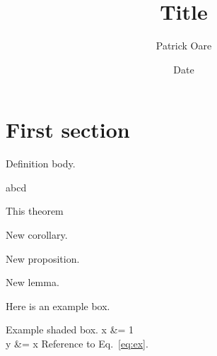 

\title{Title}
\author{Patrick Oare}
\date{Date}							%


\maketitle
\section{First section}


\begin{definition}
	Definition body.
\end{definition}

\begin{definition}
	abcd
\end{definition}

\begin{theorem}
This theorem
\end{theorem}

\begin{cor}
	New corollary.
\end{cor}

\begin{prop}
	New proposition.
\end{prop}

\begin{lemma}
	New lemma.
\end{lemma}

\begin{example}
	Here is an example box.
\end{example}

\begin{shaded}
	\raggedright
	Example shaded box. 
	\eq
		x &= 1 \\
		y &= x 
		\label{eq:ex}
	\qe
	Reference to Eq.~\eqref{eq:ex}.
\end{shaded}


